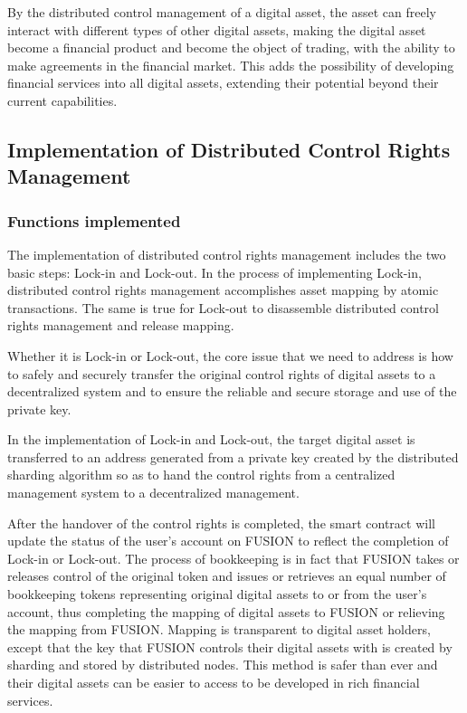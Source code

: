 \documentclass[a4paper,12pt]{article}
\begin{document}
By the distributed control management of a digital asset, the asset can freely interact with different types of other digital assets, making the digital asset become a financial product and become the object of trading, with the ability to make agreements in the financial market. This adds the possibility of developing financial services into all digital assets, extending their potential beyond their current capabilities.

\subsection{Implementation of Distributed Control Rights Management}

\subsubsection{Functions implemented}

The implementation of distributed control rights management includes the two basic steps: Lock-in and Lock-out. In the process of implementing Lock-in, distributed control rights management accomplishes asset mapping by atomic transactions. The same is true for Lock-out to disassemble distributed control rights management and release mapping.

Whether it is Lock-in or Lock-out, the core issue that we need to address is how to safely and securely transfer the original control rights of digital assets to a decentralized system and to ensure the reliable and secure storage and use of the private key.

In the implementation of Lock-in and Lock-out, the target digital asset is transferred to an address generated from a private key created by the distributed sharding algorithm so as to hand the control rights from a centralized management system to a decentralized management.

After the handover of the control rights is completed, the smart contract will update the status of the user's account on FUSION to reflect the completion of Lock-in or Lock-out. The process of bookkeeping is in fact that FUSION takes or releases control of the original token and issues or retrieves an equal number of bookkeeping tokens representing original digital assets to or from the user's account, thus completing the mapping of digital assets to FUSION or relieving the mapping from FUSION. Mapping is transparent to digital asset holders, except that the key that FUSION controls their digital assets with is created by sharding and stored by distributed nodes. This method is safer than ever and their digital assets can be easier to access to be developed in rich financial services.
\end{document}
